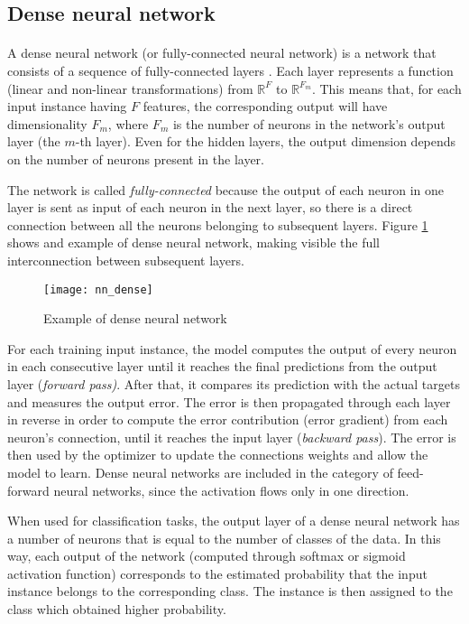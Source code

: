 \subsection{Dense neural network}
\paragraph{} A dense neural network (or fully-connected neural network) is a network that consists of a sequence of fully-connected layers \cite{OReilly:TFforDL}. Each layer represents a function (linear and non-linear transformations) from $\mathbb{R}^F$ to $\mathbb{R}^{F_m}$. This means that, for each input instance having $F$ features, the corresponding output will have dimensionality $F_m$, where $F_m$ is the number of neurons in the network's output layer (the $m$-th layer). Even for the hidden layers, the output dimension depends on the number of neurons present in the layer.

The network is called \textit{fully-connected} because the output of each neuron in one layer is sent as input of each neuron in the next layer, so there is a direct connection between all the neurons belonging to subsequent layers. Figure \ref{fig:nn_dense} shows and example of dense neural network, making visible the full interconnection between subsequent layers.
\begin{figure}[htbp]
    \centering
    \texttt{[image: nn\_dense]}
    \caption{Example of dense neural network}
    \label{fig:nn_dense}
\end{figure}

For each training input instance, the model computes the output of every neuron in each consecutive layer until it reaches the final predictions from the output layer (\textit{forward pass)}. After that, it compares its prediction with the actual targets and measures the output error. The error is then propagated through each layer in reverse in order to compute the error contribution (error gradient) from each neuron's connection, until it reaches the input layer (\textit{backward pass}). The error is then used by the optimizer to update the connections weights and allow the model to learn. Dense neural networks are included in the category of feed-forward neural networks, since the activation flows only in one direction.

When used for classification tasks, the output layer of a dense neural network has a number of neurons that is equal to the number of classes of the data. In this way, each output of the network (computed through softmax or sigmoid activation function) corresponds to the estimated probability that the input instance belongs to the corresponding class. The instance is then assigned to the class which obtained higher probability.

